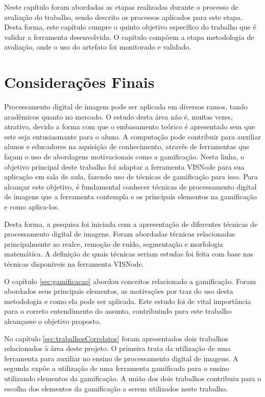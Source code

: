 \documentclass[
	12pt,				%
	oneside,			%
	a4paper,			%
	english,			%
	french,				%
	spanish,			%
	brazil,				%
	]{abntex2}
\begin{document}
Neste capítulo foram abordadas as etapas realizadas durante o processo de avaliação do trabalho, sendo descrito os processos aplicados para este etapa. Desta forma, este capítulo cumpre o quinto objetivo específico do trabalho que é validar a ferramenta desenvolvida. O capítulo compõem a etapa metodologia de avaliação, onde o uso do artefato foi monitorado e validado.

% 

\chapter[Considerações Finais]{Considerações Finais}

Processamento digital de imagem pode ser aplicada em diversos ramos, tando acadêmicos quanto no mercado. O estudo desta área não é, muitas vezes, atrativo, devido a forma com que o embasamento teórico é apresentado sem que este seja entusiasmante para o aluno. A computação pode contribuir para auxiliar alunos e educadores na aquisição de conhecimento, através de ferramentas que façam o uso de abordagens motivacionais como a gamificação. Nesta linha, o objetivo principal deste trabalho foi adaptar a ferramenta VISNode para sua aplicação em sala de aula, fazendo uso de técnicas de gamificação para isso. Para alcançar este objetivo, é fundamental conhecer técnicas de processamento digital de imagens que a ferramenta contempla e os principais elementos na gamificação e como aplica-los.

Desta forma, a pesquisa foi iniciada com a apresentação de diferentes técnicas de processamento digital de imagens. Foram abordadas técnicas relacionadas principalmente ao realce, remoção de ruído, segmentação e morfologia matemática. A definição de quais técnicas seriam estudas foi feita com base nas técnicas disponíveis na ferramenta VISNode.

O capítulo \ref{sec:gamificacao} abordou conceitos relacionado a gamificação. Foram abordados seus principais elementos, as motivações por traz do uso desta metodologia e como ela pode ser aplicada.
Este estudo foi de vital importância para o correto entendimento do assunto, contribuindo para este trabalho alcançasse o objetivo proposto.

No capítulo \ref{sec:trabalhosCorrelatos} foram apresentados dois trabalhos relacionados à área deste projeto. O primeira trata da utilização de uma ferramenta para auxiliar no ensino de processamento digital de imagens. A segunda expõe a utilização de uma ferramenta gamificada para o ensino utilizando elementos da gamificação. A união dos dois trabalhos contribuiu para o escolha dos elementos da gamificação a serem utilizados neste trabalho.
\end{document}
